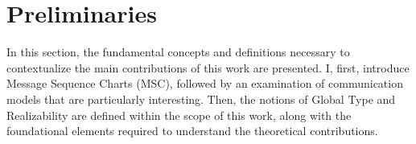 \chapter{Preliminaries}\label{sec:pre}
In this section, the fundamental concepts and definitions necessary 
to contextualize the main contributions of this work are presented. 
I, first, introduce Message Sequence Charts (MSC), followed by 
an examination of communication models that are particularly interesting. 
Then, the notions of Global Type and Realizability are 
defined within the scope of this work, along with the foundational 
elements required to understand the theoretical contributions.


